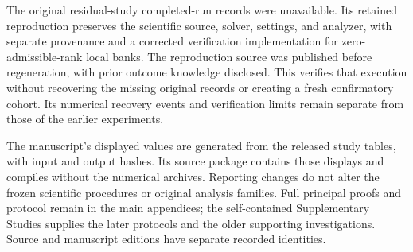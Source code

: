 The original residual-study completed-run records were unavailable.
Its retained reproduction preserves the scientific source, solver,
settings, and analyzer, with separate provenance and a corrected
verification implementation for zero-admissible-rank local banks.
The reproduction source was published before regeneration, with prior
outcome knowledge disclosed. This verifies that execution without
recovering the missing original records or creating a fresh
confirmatory cohort. Its numerical recovery events and verification
limits remain separate from those of the earlier experiments.

The manuscript's displayed values are generated from the released
study tables, with input and output hashes. Its source package contains
those displays and compiles without the numerical archives. Reporting
changes do not alter the frozen scientific procedures or original
analysis families. Full principal proofs and protocol remain in the
main appendices; the self-contained Supplementary Studies supplies the
later protocols and the older supporting investigations. Source and
manuscript editions have separate recorded identities.
